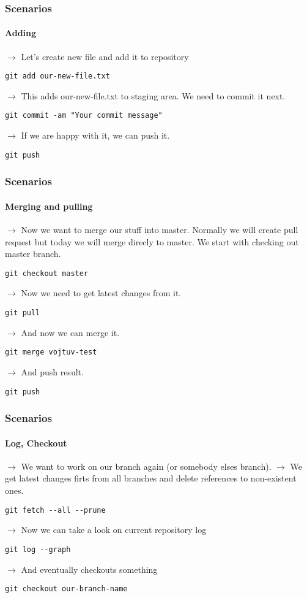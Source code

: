 \documentclass[aspectratio=169]{beamer}
\begin{document}
    \begin{frame}[fragile]
        \frametitle{Scenarios}
        \framesubtitle{Adding}
        $\rightarrow$ Let's create new file and add it to repository
        \begin{lstlisting}[gobble=12]
            git add our-new-file.txt
        \end{lstlisting}
        $\rightarrow$ This adds our-new-file.txt to staging area. We need to commit it next.
        \begin{lstlisting}[gobble=12]
            git commit -am "Your commit message"
        \end{lstlisting}
        $\rightarrow$ If we are happy with it, we can push it.
        \begin{lstlisting}[gobble=12]
            git push
        \end{lstlisting}
    \end{frame}
    \begin{frame}[fragile]
        \frametitle{Scenarios}
        \framesubtitle{Merging and pulling}
        $\rightarrow$ Now we want to merge our stuff into master. Normally we will create pull request but today we will merge direcly to master. We start with checking out master branch.
        \begin{lstlisting}[gobble=12]
            git checkout master
        \end{lstlisting}
        $\rightarrow$ Now we need to get latest changes from it.
        \begin{lstlisting}[gobble=12]
            git pull
        \end{lstlisting}
        $\rightarrow$ And now we can merge it.
        \begin{lstlisting}[gobble=12]
            git merge vojtuv-test
        \end{lstlisting}
        $\rightarrow$ And push result.
        \begin{lstlisting}[gobble=12]
            git push
        \end{lstlisting}
    \end{frame}
    \begin{frame}[fragile]
        \frametitle{Scenarios}
        \framesubtitle{Log, Checkout}
        $\rightarrow$ We want to work on our branch again (or somebody elses branch).\newline
        $\rightarrow$ We get latest changes firts from all branches and delete references to non-existent ones.
        \begin{lstlisting}[gobble=12]
            git fetch --all --prune
        \end{lstlisting}
        $\rightarrow$ Now we can take a look on current repository log
        \begin{lstlisting}[gobble=12]
            git log --graph
        \end{lstlisting}
        $\rightarrow$ And eventually checkouts something
        \begin{lstlisting}[gobble=12]
            git checkout our-branch-name
        \end{lstlisting}
    \end{frame}
\end{document}
